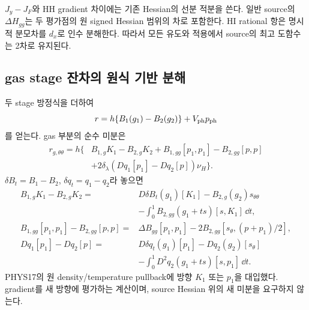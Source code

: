 $J_y-J_F$와 HH gradient 차이에는 기존 Hessian의 선분 적분을 쓴다.
일반 source의 $\Delta H_{gg}$는 두 평가점의 원 signed Hessian 범위의 차로 포함한다.
HI rational 항은 명시적 분모차를 $d_x$로 인수 분해한다.
따라서 모든 유도와 적용에서 source의 최고 도함수는 2차로 유지된다.

\subsection{gas stage 잔차의 원식 기반 분해}
두 stage 방정식을 더하여
\[
r=h\{B_1(g_1)-B_2(g_2)\}+V_{\rm ph}p_{\rm ph}
\]
를 얻는다. gas 부분의 순수 미분은
\[
\begin{aligned}
r_{g,\theta\theta}=h\{&
B_{1,g}K_1-B_{2,g}K_2
+B_{1,gg}[p_1,p_1]-B_{2,gg}[p,p]\\
&+2\delta_\lambda(Dq_1[p_1]-Dq_2[p])\nu_H\}.
\end{aligned}
\tag{19.9}
\]
$\delta B_t=B_1-B_2$, $\delta q_t=q_1-q_2$라 놓으면
\[
\begin{aligned}
B_{1,g}K_1-B_{2,g}K_2
={}&D\delta B_t(g_1)[K_1]-B_{2,g}(g_2)s_{\theta\theta}\\
&-\int_0^1B_{2,gg}(g_1+ts)[s,K_1]\,\dd t,\\
B_{1,gg}[p_1,p_1]-B_{2,gg}[p,p]
={}&\Delta B_{gg}[p_1,p_1]
-2B_{2,gg}[s_\theta,(p+p_1)/2],\\
Dq_1[p_1]-Dq_2[p]
={}&D\delta q_t(g_1)[p_1]-Dq_2(g_2)[s_\theta]\\
&-\int_0^1D^2q_2(g_1+ts)[s,p_1]\,\dd t.
\end{aligned}
\tag{19.10}
\]
PHYS17의 원 density/temperature pullback에 방향 $K_1$ 또는 $p_1$을 대입했다.
gradient를 새 방향에 평가하는 계산이며, source Hessian 위의 새 미분을 요구하지 않는다.

